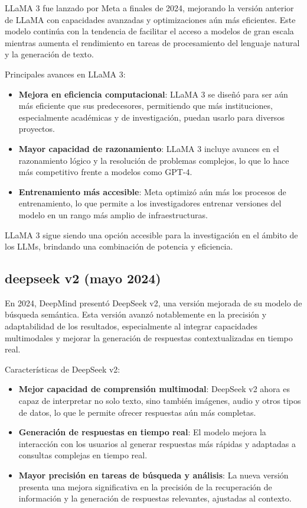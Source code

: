 LLaMA 3 fue lanzado por Meta a finales de 2024, mejorando la versión anterior de LLaMA con capacidades avanzadas y optimizaciones aún más eficientes. 
Este modelo continúa con la tendencia de facilitar el acceso a modelos de gran escala mientras aumenta el rendimiento en tareas de procesamiento del lenguaje natural y la generación de texto.

Principales avances en LLaMA 3:
\begin{itemize}
    \item \textbf{Mejora en eficiencia computacional}: LLaMA 3 se diseñó para ser aún más eficiente que sus predecesores, permitiendo que más instituciones, especialmente académicas y de investigación, puedan usarlo para diversos proyectos.
    \item \textbf{Mayor capacidad de razonamiento}: LLaMA 3 incluye avances en el razonamiento lógico y la resolución de problemas complejos, lo que lo hace más competitivo frente a modelos como GPT-4.
    \item \textbf{Entrenamiento más accesible}: Meta optimizó aún más los procesos de entrenamiento, lo que permite a los investigadores entrenar versiones del modelo en un rango más amplio de infraestructuras.
\end{itemize}

LLaMA 3 sigue siendo una opción accesible para la investigación en el ámbito de los LLMs, brindando una combinación de potencia y eficiencia.










\subsection{deepseek v2 (mayo 2024)}

En 2024, DeepMind presentó DeepSeek v2, una versión mejorada de su modelo de búsqueda semántica. 
Esta versión avanzó notablemente en la precisión y adaptabilidad de los resultados, especialmente al integrar capacidades multimodales y mejorar la generación de respuestas contextualizadas en tiempo real.

Características de DeepSeek v2:
\begin{itemize}
    \item \textbf{Mejor capacidad de comprensión multimodal}: DeepSeek v2 ahora es capaz de interpretar no solo texto, sino también imágenes, audio y otros tipos de datos, lo que le permite ofrecer respuestas aún más completas.
    \item \textbf{Generación de respuestas en tiempo real}: El modelo mejora la interacción con los usuarios al generar respuestas más rápidas y adaptadas a consultas complejas en tiempo real.
    \item \textbf{Mayor precisión en tareas de búsqueda y análisis}: La nueva versión presenta una mejora significativa en la precisión de la recuperación de información y la generación de respuestas relevantes, ajustadas al contexto.
\end{itemize}

